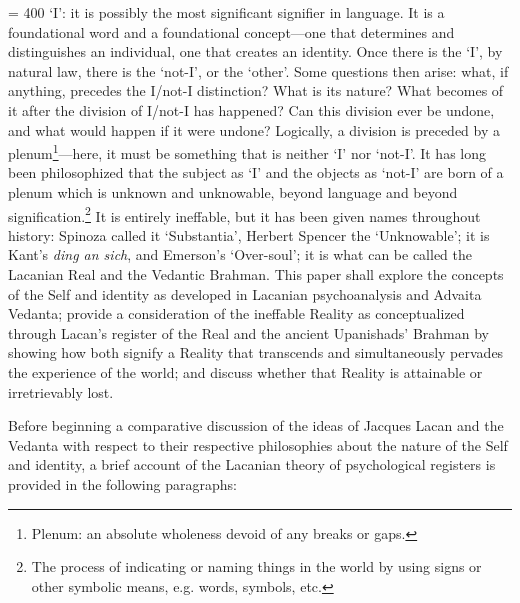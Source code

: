 \pretolerance = 400
`I': it is possibly the most significant signifier in language. It is a
foundational word and a foundational concept---one that determines and
distinguishes an individual, one that creates an identity. Once there is
the `I', by natural law, there is the `not-I', or the `other'. Some
questions then arise: what, if anything, precedes the I/not-I
distinction? What is its nature? What becomes of it after the division
of I/not-I has happened? Can this division ever be undone, and what
would happen if it were undone? Logically, a division is preceded by a
plenum\footnote{Plenum: an absolute wholeness devoid of any breaks or
  gaps.}---here, it must be something that is neither `I' nor `not-I'.
It has long been philosophized that the subject as `I' and the objects
as `not-I' are born of a plenum which is unknown and unknowable, beyond
language and beyond signification.\footnote{The process of indicating or
  naming things in the world by using signs or other symbolic means,
  e.g. words, symbols, etc.} It is entirely ineffable, but it has been
given names throughout history: Spinoza called it `Substantia', Herbert
Spencer the `Unknowable'; it is Kant's \emph{ding an sich}, and
Emerson's `Over-soul'; it is what can be called the Lacanian Real and
the Vedantic Brahman. This paper shall explore the concepts of the Self
and identity as developed in Lacanian psychoanalysis and Advaita
Vedanta; provide a consideration of the ineffable Reality as
conceptualized through Lacan's register of the Real and the ancient
Upanishads' Brahman by showing how both signify a Reality that
transcends and simultaneously pervades the experience of the world; and
discuss whether that Reality is attainable or irretrievably lost.

Before beginning a comparative discussion of the ideas of Jacques Lacan
and the Vedanta with respect to their respective philosophies about the
nature of the Self and identity, a brief account of the Lacanian theory
of psychological registers is provided in the following paragraphs:

